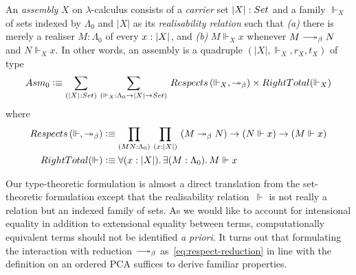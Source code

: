 \documentclass[a4paper,UKenglish,numberwithinsect,cleveref,thm-restate,draft]{lipics-v2021}
\numberwithin{equation}{section}
\theoremstyle{definition}
\theoremstyle{plain}
\begin{document}
\begin{definition}\label{def:assembly}
  An \emph{assembly} $X$ on $\lambda$-calculus consists of a \emph{carrier} set $|X| : \set$ and a family ${\Vdash_X}$ of sets indexed by $\Lambda_0$ and $|X|$ as its \emph{realisability relation} such that
  \emph{(a)} there is merely a realiser $M : \Lambda_0$ of every $x : \mathopen{}\left|X\right|_{}^{}\mathclose{}$, and
  \emph{(b)} $M \Vdash_X x$ whenever $M \reduce N$ and $N \Vdash_X x$.
  In other words, an assembly is a quadruple $(|X|, \Vdash_X, r_X, t_X)$ of type
  \[
    \Asm_0 \defeq \sm{\bproj{X} : {\set}}{\mathord{\Vdash_X}:\Lambda_0 \to |X| \to \set} 
      \mathsf{Respects}\left(\Vdash_X, \mathord{\twoheadrightarrow_\beta}\right)
      \times \mathsf{RightTotal}({\Vdash_X})
  \]
  where
  \begin{align}
    \mathsf{Respects}\left(\mathord{\Vdash}, \mathord{\twoheadrightarrow_\beta}\right) & \defeq\prd{M N : \Lambda_0}{x : |X|} \left(M \twoheadrightarrow_ \beta N\right) \to \left(N \Vdash x\right) \to \left(M \Vdash x\right) \label{eq:respect-reduction} \\      
    \mathsf{RightTotal}(\Vdash) & \defeq \fall{x : |X|}\exis{M : \Lambda_0} M \Vdash x
    \label{eq:right-total}
  \end{align}
\end{definition}

Our type-theoretic formulation is almost a direct translation from the set-theoretic formulation except that the realisability relation~$\Vdash$ is not really a relation but an indexed family of sets.
As we would like to account for intensional equality in addition to extensional equality between terms,
computationally equivalent terms should not be identified \emph{a priori}.
It turns out that formulating the interaction with reduction $\reduce$ as~\eqref{eq:respect-reduction} in line with the definition on an ordered PCA suffices to derive familiar properties.
\end{document}
